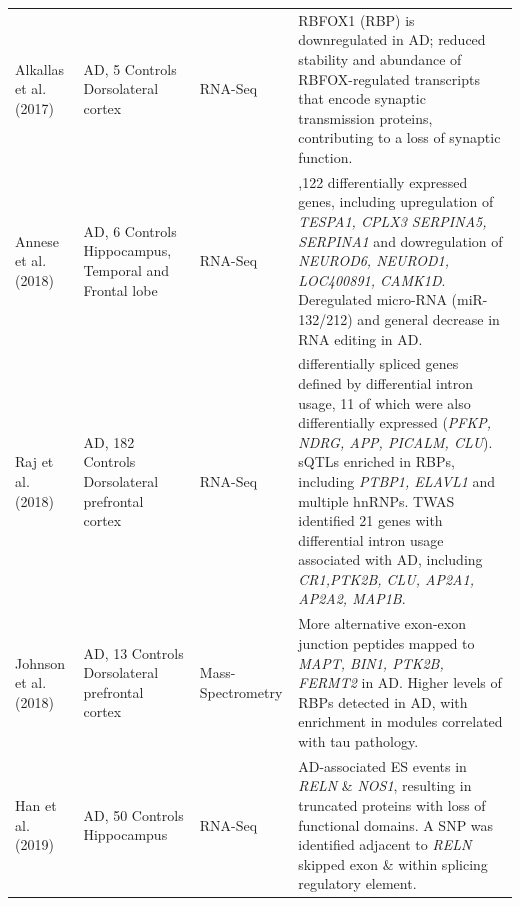 \begin{landscape}
\begin{longtable}[c]{p{3cm}p{4cm}p{3cm}p{16cm}}
		\centering Alkallas et al. (2017)\cite{Alkallas2017} &
		\centering 6 AD, 5 Controls \newline Dorsolateral cortex &
		\centering RNA-Seq &
		\tabitem RBFOX1 (RBP) is downregulated in AD; reduced stability and abundance of RBFOX-regulated transcripts that encode synaptic transmission proteins, contributing to a loss of synaptic function.	\\
		\hdashline[0.5pt/5pt]
		
		\centering Annese et al. (2018)\cite{Annese2018} &
		\centering 6 AD, 6 Controls \newline Hippocampus, Temporal and Frontal lobe &
		\centering RNA-Seq &
		\tabitem 2,122 differentially expressed genes, including upregulation of \textit{TESPA1, CPLX3 SERPINA5, SERPINA1} and dowregulation of \textit{NEUROD6, NEUROD1, LOC400891, CAMK1D}. \newline
		\tabitem Deregulated micro-RNA (miR-132/212) and general decrease in RNA editing in AD. \\
		\hdashline[0.5pt/5pt]
		
		\centering Raj et al. \newline (2018)\cite{Raj2018} &
		\centering 268 AD, 182 Controls \newline Dorsolateral prefrontal cortex &
		\centering RNA-Seq &
		\tabitem 84 differentially spliced genes defined by differential intron usage, 11 of which were also differentially expressed (\textit{PFKP, NDRG, APP, PICALM, CLU}). \newline
		\tabitem sQTLs enriched in RBPs, including \textit{PTBP1, ELAVL1} and multiple hnRNPs. \newline
		\tabitem TWAS identified 21 genes with differential intron usage associated with AD, including \textit{CR1,PTK2B, CLU, AP2A1, AP2A2, MAP1B}. \\
		\hdashline[0.5pt/5pt]
		
		\centering Johnson et al. \newline (2018)\cite{Johnson2018} &
		\centering 20 AD, 13 Controls \newline Dorsolateral prefrontal cortex &
		\centering Mass-Spectrometry &
		\tabitem More alternative exon-exon junction peptides mapped to \textit{MAPT, BIN1, PTK2B, FERMT2} in AD. \newline 
		\tabitem Higher levels of RBPs detected in AD, with enrichment in modules correlated with tau pathology. \\
		\hdashline[0.5pt/5pt]	
		
		\centering Han et al. (2019) \cite{Han2019} &
		\centering 24 AD, 50 Controls \newline Hippocampus &
		\centering RNA-Seq &
		\tabitem 3 AD-associated ES events in \textit{RELN} \& \textit{NOS1}, resulting in truncated proteins with loss of functional domains. A SNP was identified adjacent to \textit{RELN} skipped exon \& within splicing regulatory element. \\
		

\end{longtable}
\end{landscape}
